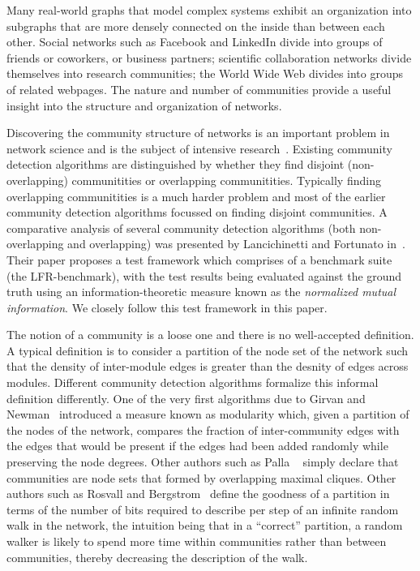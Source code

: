 Many real-world graphs that model complex systems exhibit an organization 
into subgraphs that are more densely connected on the inside than between each other. 
Social networks such as Facebook and LinkedIn divide into groups of friends 
or coworkers, or business partners; scientific collaboration networks divide 
themselves into research communities; the World Wide Web divides into groups 
of related webpages. The nature and number of communities provide 
a useful insight into the structure and organization of networks. 

Discovering the community structure of networks is an 
important problem in network science and is the subject 
of intensive research~\cite{GN02, GN04, CNM04, RCC04, DM04, PDFV05, NL07, 
BGLL08, RB08, RN09}. Existing community detection algorithms are 
distinguished by whether they find disjoint (non-overlapping) 
communitities or overlapping communitities. Typically finding 
overlapping communitities is a much harder problem and most of the 
earlier community detection algorithms focussed on finding disjoint 
communities. A comparative analysis of several community detection algorithms 
(both non-overlapping and overlapping) was presented by Lancichinetti and Fortunato 
in~\cite{LF09}. Their paper proposes a test framework which comprises of a 
benchmark suite (the LFR-benchmark), with the test results being evaluated against 
the ground truth using an information-theoretic measure known as the \emph{normalized 
mutual information}. We closely follow this test framework in this paper. 


The notion of a community is a loose one and there is no well-accepted definition.
A typical definition is to consider a partition of the node set of the network 
such that the density of inter-module edges is greater than the desnity of edges 
across modules. Different community detection algorithms formalize this informal 
definition differently. One of the very first algorithms due to 
Girvan and Newman~\cite{GN02} introduced a measure known as modularity 
which, given a partition of the nodes of the network, compares the fraction of 
inter-community edges with the edges that would be present if the edges had been 
added randomly while preserving the node degrees. Other authors such as Palla 
\etal~\cite{PDFV05} simply declare that communities are node sets that formed 
by overlapping maximal cliques. Other authors such as Rosvall and Bergstrom~\cite{RB08} 
define the goodness of a partition in terms of the number of bits required to 
describe per step of an infinite random walk in the network, the intuition being 
that in a ``correct'' partition, a random walker is likely to spend more time 
within communities rather than between communities, thereby decreasing the 
description of the walk.  

